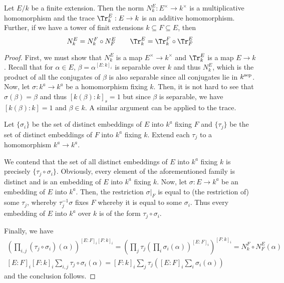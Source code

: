 \begin{proposition}
    Let $E/k$ be a finite extension. Then the norm $N^E_k: E^\times\to k^\times$ is a multiplicative homomorphism and the trace $\Tr^E_k: E\to k$ is an additive homomorphism. Further, if we have a tower of finit extensions $k\subseteq F\subseteq E$, then 
    \begin{equation*}
        N^E_k = N^F_k\circ N^E_F\qquad \Tr^E_k = \Tr^F_k\circ\Tr^E_F
    \end{equation*}
\end{proposition}
\begin{proof}
    First, we must show that $N^E_k$ is a map $E^\times\to k^\times$ and $\Tr^E_k$ is a map $E\to k$. Recall that for $\alpha\in E$, $\beta = \alpha^{[E:k]_i}$ is separable over $k$ and thus $N^E_k$, which is the product of all the conjugates of $\beta$ is also separable since all conjugates lie in $k^{\text{sep}}$. Now, let $\sigma: k^a\to k^a$ be a homomorphism fixing $k$. Then, it is not hard to see that $\sigma(\beta) = \beta$ and thus $[k(\beta):k]_s = 1$ but since $\beta$ is separable, we have $[k(\beta):k] = 1$ and $\beta\in k$. A similar argument can be applied to the trace.

    Let $\{\sigma_i\}$ be the set of distinct embeddings of $E$ into $k^a$ fixing $F$ and $\{\tau_j\}$ be the set of distinct embeddings of $F$ into $k^a$ fixing $k$. Extend each $\tau_j$ to a homomorphism $k^a\to k^a$. 
    
    We contend that the set of all distinct embeddings of $E$ into $k^a$ fixing $k$ is precisely $\{\tau_j\circ\sigma_i\}$. Obviously, every element of the aforementioned family is distinct and is an embedding of $E$ into $k^a$ fixing $k$. Now, let $\sigma: E\to k^a$ be an embedding of $E$ into $k^a$. Then, the restriction $\sigma|_F$ is equal to (the restriction of) some $\tau_j$, whereby $\tau_j^{-1}\sigma$ fixes $F$ whereby it is equal to some $\sigma_i$. Thus every embedding of $E$ into $k^a$ over $k$ is of the form $\tau_j\circ\sigma_i$.

    Finally, we have 
    \begin{align*}
        \left(\prod_{i,j}(\tau_j\circ\sigma_i)(\alpha)\right)^{[E:F]_i[F:k]_i} = \left(\prod_{j}\tau_j\left(\prod_{i}\sigma_i(\alpha)\right)^{[E:F]_i}\right)^{[F:k]_i} = N^F_k\circ N^E_F(\alpha)\\
        [E:F]_i[F:k]_i\sum_{i,j}\tau_j\circ\sigma_i(\alpha) = [F:k]_i\sum_j\tau_j\left([E:F]_i\sum_{i}\sigma_i(\alpha)\right)
    \end{align*}
    and the conclusion follows.
\end{proof}

